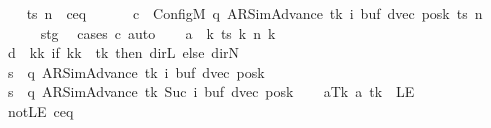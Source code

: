 \begin{isabellebody}
\ \ \isamarkupfalse%
\ ts\ n\ \ c{\isacharprime}{\kern0pt}{\isacharunderscore}{\kern0pt}eq{\isacharcolon}{\kern0pt}\isanewline
\ \ \ \ \ \ {\isachardoublequoteopen}c{\isacharprime}{\kern0pt}\ {\isacharequal}{\kern0pt}\ Config\isactrlsub M\ {\isacharparenleft}{\kern0pt}q{\isacharcomma}{\kern0pt}\ AR{\isacharunderscore}{\kern0pt}SimAdvance{\isacharcomma}{\kern0pt}\ tk{\isacharcomma}{\kern0pt}\ i{\isacharcomma}{\kern0pt}\ buf{\isacharcomma}{\kern0pt}\ dvec{\isacharcomma}{\kern0pt}\ posk{\isacharparenright}{\kern0pt}\ ts\ n{\isachardoublequoteclose}\isanewline
\ \ \ \ \isamarkupfalse%
\ stg\ \isamarkupfalse%
\ {\isacharparenleft}{\kern0pt}cases\ c{\isacharprime}{\kern0pt}{\isacharparenright}{\kern0pt}\ auto\isanewline
\ \ \isamarkupfalse%
\ {\isacharquery}{\kern0pt}a\ {\isacharequal}{\kern0pt}\ {\isachardoublequoteopen}{\isasymlambda}k{\isachardot}{\kern0pt}\ ts\ k\ {\isacharparenleft}{\kern0pt}n\ k{\isacharparenright}{\kern0pt}{\isachardoublequoteclose}\isanewline
\ \ \isamarkupfalse%
\ {\isacharquery}{\kern0pt}d\ {\isacharequal}{\kern0pt}\ {\isachardoublequoteopen}{\isasymlambda}kk{\isachardot}{\kern0pt}\ if\ kk\ {\isacharequal}{\kern0pt}\ tk\ then\ dir{\isachardot}{\kern0pt}L\ else\ dir{\isachardot}{\kern0pt}N{\isachardoublequoteclose}\isanewline
\ \ \isamarkupfalse%
\ {\isacharquery}{\kern0pt}s\ {\isacharequal}{\kern0pt}\ {\isachardoublequoteopen}{\isacharparenleft}{\kern0pt}q{\isacharcomma}{\kern0pt}\ AR{\isacharunderscore}{\kern0pt}SimAdvance{\isacharcomma}{\kern0pt}\ tk{\isacharcomma}{\kern0pt}\ i{\isacharcomma}{\kern0pt}\ buf{\isacharcomma}{\kern0pt}\ dvec{\isacharcomma}{\kern0pt}\ posk{\isacharparenright}{\kern0pt}{\isachardoublequoteclose}\isanewline
\ \ \isamarkupfalse%
\ {\isacharquery}{\kern0pt}s{\isacharprime}{\kern0pt}\ {\isacharequal}{\kern0pt}\ {\isachardoublequoteopen}{\isacharparenleft}{\kern0pt}q{\isacharcomma}{\kern0pt}\ AR{\isacharunderscore}{\kern0pt}SimAdvance{\isacharcomma}{\kern0pt}\ tk{\isacharcomma}{\kern0pt}\ Suc\ i{\isacharcomma}{\kern0pt}\ buf{\isacharcomma}{\kern0pt}\ dvec{\isacharcomma}{\kern0pt}\ posk{\isacharparenright}{\kern0pt}{\isachardoublequoteclose}\isanewline
\ \ \isamarkupfalse%
\ aTk{\isacharcolon}{\kern0pt}\ {\isachardoublequoteopen}{\isacharquery}{\kern0pt}a\ tk\ {\isasymnoteq}\ LE{}{\isachardoublequoteclose}\ \isamarkupfalse%
\ notLE\ c{\isacharprime}{\kern0pt}{\isacharunderscore}{\kern0pt}eq\ \isamarkupfalse%

\end{isabellebody}
